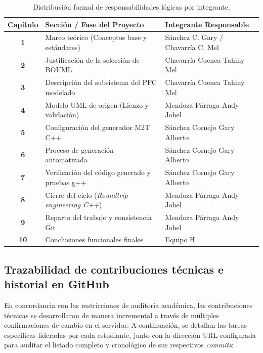 \documentclass[journal,onecolumn]{IEEEtran}
\begin{document}
	\begin{table}[H]
		\centering
		\caption{Distribución formal de responsabilidades lógicas por integrante.}
		\label{tab:reparto_responsabilidades}
		\begin{tabularx}{\linewidth}{|c|l|X|}
			\hline
			\textbf{Capítulo} & \textbf{Sección / Fase del Proyecto} & \textbf{Integrante Responsable} \\
			\hline
			\textbf{1} & Marco teórico (Conceptos base y estándares) & Sánchez C. Gary / Chavarría C. Mel \\ \hline
			\textbf{2} & Justificación de la selección de BOUML & Chavarría Cuenca Tahiny Mel \\ \hline
			\textbf{3} & Descripción del subsistema del PFC modelado & Chavarría Cuenca Tahiny Mel \\ \hline
			\textbf{4} & Modelo UML de origen (Lienzo y validación) & Mendoza Párraga Andy Johel \\ \hline
			\textbf{5} & Configuración del generador M2T C++ & Sánchez Cornejo Gary Alberto \\ \hline
			\textbf{6} & Proceso de generación automatizada & Sánchez Cornejo Gary Alberto \\ \hline
			\textbf{7} & Verificación del código generado y pruebas g++ & Sánchez Cornejo Gary Alberto \\ \hline
			\textbf{8} & Cierre del ciclo (\textit{Roundtrip engineering C++}) & Mendoza Párraga Andy Johel \\ \hline
			\textbf{9} & Reparto del trabajo y consistencia Git & Mendoza Párraga Andy Johel \\ \hline
			\textbf{10} & Conclusiones funcionales finales & Equipo H \\
			\hline
		\end{tabularx}
	\end{table}
	
	\subsection{Trazabilidad de contribuciones técnicas e historial en GitHub}
	En concordancia con las restricciones de auditoría académica, las contribuciones técnicas se desarrollaron de manera incremental a través de múltiples confirmaciones de cambio en el servidor. A continuación, se detallan las tareas específicas lideradas por cada estudiante, junto con la dirección URL configurada para auditar el listado completo y cronológico de sus respectivos \textit{commits}:
	
\end{document}
